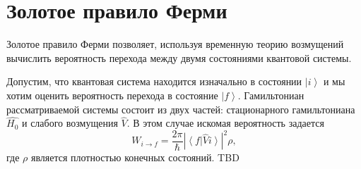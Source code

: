 \section{Золотое правило Ферми}
\label{addQuantGoldenRuleFermi}
Золотое правило Ферми позволяет, используя временную теорию возмущений
вычислить вероятность перехода между двумя состояниями квантовой
системы.

Допустим, что квантовая система находится изначально в состоянии
$\left|i\right>$ и мы хотим оценить вероятность перехода в состояние 
$\left|f\right>$. Гамильтониан рассматриваемой системы состоит из
двух частей: стационарного гамильтониана $\hat{H_0}$ и слабого
возмущения $\hat{V}$. В этом случае искомая вероятность задается
\begin{equation}
  W_{i \rightarrow f} = \frac{2 \pi}{\hbar}
  \left|
  \left<
  f
  \right|
  \hat{V}
  \left.
  i
  \right>
  \right|^2 \rho
  \nonumber,
\end{equation}
где $\rho$ является плотностью конечных состояний.
TBD
